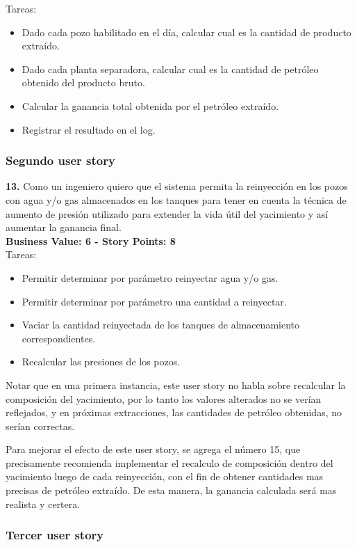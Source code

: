 Tareas:

\begin{itemize}
    \item Dado cada pozo habilitado en el día, calcular cual es la cantidad de producto extraído.
    \item Dado cada planta separadora, calcular cual es la cantidad de petróleo obtenido del producto bruto.
    \item Calcular la ganancia total obtenida por el petróleo extraído.
    \item Registrar el resultado en el log.
\end{itemize}

\subsubsection{Segundo user story}

\textbf{13.} Como un ingeniero quiero que el sistema permita la reinyección en los pozos con agua y/o gas almacenados en los tanques para tener en cuenta la técnica de aumento de presión utilizado para extender la vida útil del yacimiento y así aumentar la ganancia final.\\
\textbf{Business Value: 6 - Story Points: 8}\\

Tareas:

\begin{itemize}
    \item Permitir determinar por parámetro reinyectar agua y/o gas.
    \item Permitir determinar por parámetro una cantidad a reinyectar.
    \item Vaciar la cantidad reinyectada de los tanques de almacenamiento correspondientes.
    \item Recalcular las presiones de los pozos.
\end{itemize}

Notar que en una primera instancia, este user story no habla sobre recalcular la composición del yacimiento, por lo tanto los valores alterados no se verían reflejados, y en próximas extracciones, las cantidades de petróleo obtenidas, no serían correctas.

Para mejorar el efecto de este user story, se agrega el número 15, que precisamente recomienda implementar el recalculo de composición dentro del yacimiento luego de cada reinyección, con el fin de obtener cantidades mas precisas de petróleo extraído. De esta manera, la ganancia calculada será mas realista y certera.

\subsubsection{Tercer user story}

